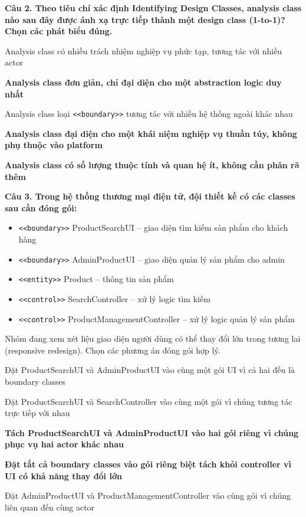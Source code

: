 \documentclass[11pt,a4paper]{article}
\newenvironment{pa}
  {\begin{list}{}{\leftmargin=0.95cm\labelwidth=0.5cm\labelsep=0.3cm
     \itemsep=0pt\parsep=0pt\topsep=0pt\partopsep=0pt}}
  {\end{list}}
\newcommand{\A}{\item[A.]}
\newcommand{\B}{\item[B.]}
\newcommand{\C}{\item[C.]}
\newcommand{\D}{\item[D.]}
\newcommand{\E}{\item[E.]}
\begin{document}
\par\noindent\textbf{Câu 2. Theo tiêu chí xác định Identifying Design Classes, analysis class nào sau đây được ánh xạ trực tiếp thành một design class (1-to-1)? Chọn \textbf{các} phát biểu đúng.}
\begin{pa}
  \A Analysis class có nhiều trách nhiệm nghiệp vụ phức tạp, tương tác với nhiều actor
  \B {\bfseries Analysis class đơn giản, chỉ đại diện cho một abstraction logic duy nhất}
  \C Analysis class loại \verb|<<boundary>>| tương tác với nhiều hệ thống ngoài khác nhau
  \D {\bfseries Analysis class đại diện cho một khái niệm nghiệp vụ thuần túy, không phụ thuộc vào platform}
  \E {\bfseries Analysis class có số lượng thuộc tính và quan hệ ít, không cần phân rã thêm}
\end{pa}
\vspace{4pt}
\par\noindent\textbf{Câu 3. Trong hệ thống thương mại điện tử, đội thiết kế có các classes sau cần đóng gói:}
\begin{itemize}[leftmargin=1.3cm,itemsep=0pt,topsep=1pt,parsep=0pt]
  \item \verb|<<boundary>>| ProductSearchUI -- giao diện tìm kiếm sản phẩm cho khách hàng
  \item \verb|<<boundary>>| AdminProductUI -- giao diện quản lý sản phẩm cho admin
  \item \verb|<<entity>>| Product -- thông tin sản phẩm
  \item \verb|<<control>>| SearchController -- xử lý logic tìm kiếm
  \item \verb|<<control>>| ProductManagementController -- xử lý logic quản lý sản phẩm
\end{itemize}
\vspace{2pt}
Nhóm đang xem xét liệu giao diện người dùng có thể thay đổi lớn trong tương lai (responsive redesign). Chọn các phương án đóng gói hợp lý.
\begin{pa}
  \A Đặt ProductSearchUI và AdminProductUI vào cùng một gói UI vì cả hai đều là boundary classes
  \B Đặt ProductSearchUI và SearchController vào cùng một gói vì chúng tương tác trực tiếp với nhau
  \C {\bfseries Tách ProductSearchUI và AdminProductUI vào hai gói riêng vì chúng phục vụ hai actor khác nhau}
  \D {\bfseries Đặt tất cả boundary classes vào gói riêng biệt tách khỏi controller vì UI có khả năng thay đổi lớn}
  \E Đặt AdminProductUI và ProductManagementController vào cùng gói vì chúng liên quan đến cùng actor
\end{pa}
\end{document}
